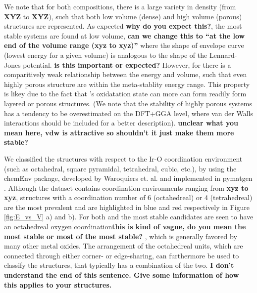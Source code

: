 We note that for both compositions,
there is a large variety in density (from \textbf{XYZ} to \textbf{XYZ}),
such that both low volume (dense) and high volume (porous) structures are represented.
%
As expected \textbf{why do you expect this?}, the most stable systems are found at low volume, \textbf{can we change this to ``at the low end of the volume range (xyz to xyz)''}
where the shape of envelope curve (lowest energy for a given volume) is analogous to the shape of the Lennard-Jones potential. \textbf{is this important or expected?}
%
However, for \IrOthree there is a comparitively weak relationship between the energy and volume,
such that even highly porous structure are within the meta-stablity energy range.
%
This property is likey due to the fact that \IrOthree's oxidatation state can more can form readily form layered or porous structures.
%
(We note that the stability of highly porous systems has a tendency to be overestimated on the DFT+GGA level, where van der Walls interactions should be included for a better description). \textbf{unclear what you mean here, vdw is attractive so shouldn't it just make them more stable?}



We classified the structures with respect to the Ir-O coordination environment (such as octahedral, square pyramidal, tetrahedral, cubic, etc.), by using the chemEnv package, developed by Waroquiers et. al. \cite{Waroquiers2017} and implemented in pymatgen \cite{Ong2013}. Although the dataset contains  coordination environments ranging from \textbf{xyz to xyz}, structures with a coordination number of 6 (octahedreal) or 4 (tetrahedreal) are the most prevalent and are highlighted in blue and red respectively in Figure \ref{fig:E_vs_V} a) and b). For both \IrOtwo and \IrOthree the most stable candidates are seen to have an octahedreal oxygen coordination\textbf{this is kind of vague, do you mean the most stable or most of the most stable?} , which is generally favored by many other metal oxides. \cite{Waroquiers2017} The arrangement of the octahedreal units, which are connected through either corner- or edge-sharing, can furthermore be used to classify the structures, that typically has a combination of the two. \textbf{I don't understand the end of this sentence.  Give some information of how this applies to your structures.}

